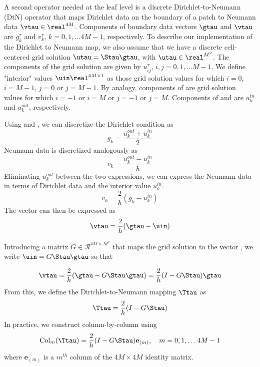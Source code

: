 A second operator needed at the leaf level is a discrete Dirichlet-to-Neumann (DtN) operator \Ttau that maps Dirichlet data \gtau on the boundary of a patch to Neumann data $\vtau \in \real^{4M}$. Components of boundary data vectors $\gtau$ and $\vtau$ are $g^{\tau}_k$ and $v^{\tau}_k$, $k = 0,1,\hdots 4M-1$, respectively.  To describe our implementation of the Dirichlet to Neumann map, we also assume that we have a discrete cell-centered grid solution $\utau = \Stau \gtau$, with $\utau \in \real^{M^2}$.  The components of the grid solution are given by $u^\tau_{ij}$, $i,j = 0,1,\hdots M-1$.  We define "interior" values $\uin \real^{4M \times 1}$ as those grid solution values \utau for which $i = 0$, $i = M-1$, $j = 0$ or $j = M-1$.  By analogy, components of \uout are grid solution values for which $i=-1$ or $i = M$ or $j = -1$ or $j = M$.   Components of \uin and \uout are $u^{in}_k$ and $u^{out}_k$, respectively.   

Using \uin and \uout, we can discretize the Dirichlet condition as
\begin{equation}
g_k = \frac{u_k^{out} + u_k^{in}}{2}
\end{equation}
Neumann data is discretized analogously as
\begin{equation}
v_k = \frac{u_k^{out} - u_k^{in}}{h}
\end{equation}
Eliminating $u_{k}^{out}$  between the two expressions, we  can express the Neumann data in terms of Dirichlet data and the interior value $u^{in}_k$.  
\begin{equation}
v_k = \frac{2}{h}(g_k - u^{in}_k)
\end{equation}
The vector \vtau can then be expressed as 
\begin{equation}
\vtau = \frac{2}{h}(\gtau - \uin)
\end{equation}

Introducing a matrix $G \in \mathcal R^{4M \times M^2}$ that maps the grid solution \utau to the vector \uin, we write $\uin = G\Stau \gtau$ so that

\begin{equation}
\vtau = \frac{2}{h}(\gtau - G \Stau \gtau) = 
\frac{2}{h}(I - G \Stau)\gtau
\end{equation}
From this, we define the Dirichlet-to-Neumann mapping $\Ttau$ as
\begin{equation}
\Ttau = \frac{2}{h}(I - G\Stau)
\label{eq:map_D2N}
\end{equation}
In practice, we construct \Ttau column-by-column using
\begin{equation}
\mbox{Col}_m(\Ttau) = \frac{2}{h}(I - G \Stau)\mathbf e_{(m)}, \quad m = 0,1,\hdots 4M-1
\end{equation}
where $\mathbf e_{(m)}$ is a $m^{th}$ column of the $4M \times 4M$ identity matrix. 

